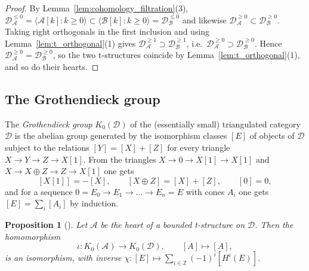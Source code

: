 \documentclass[12pt]{amsart}
\newtheorem{proposition}[theorem]{Proposition}
\numberwithin{theorem}{section}
\theoremstyle{definition}
\newcommand{\ZZ}{\mathbb{Z}}
\newcommand{\calA}{\mathcal{A}}
\newcommand{\calB}{\mathcal{B}}
\newcommand{\Kgroup}{K_0}
\newcommand{\calD}{\mathcal{D}}
\newcommand{\Dle}[1]{\calD^{\leqslant #1}}
\newcommand{\Dge}[1]{\calD^{\geqslant #1}}
\begin{document}
	\begin{proof}
		By Lemma~\ref{lem:cohomology_filtration}(3), $\Dle{0}_{\calA} = \langle \calA[k] : k \geqslant 0 \rangle \subset \langle \calB[k] : k \geqslant 0 \rangle = \Dle{0}_{\calB}$ and likewise $\Dge{0}_{\calA} \subset \Dge{0}_{\calB}$.
		Taking right orthogonals in the first inclusion and using Lemma~\ref{lem:t_orthogonal}(1) gives $\Dge{1}_{\calA} \supset \Dge{1}_{\calB}$, i.e.\ $\Dge{0}_{\calA} \supset \Dge{0}_{\calB}$.
		Hence $\Dge{0}_{\calA} = \Dge{0}_{\calB}$, so the two t-structures coincide by Lemma~\ref{lem:t_orthogonal}(1), and so do their hearts.
	\end{proof}
	
	\subsection{The Grothendieck group}
	
	The \emph{Grothendieck group} $\Kgroup(\calD)$ of the (essentially small) triangulated category $\calD$ is the abelian group generated by the isomorphism classes $[E]$ of objects of $\calD$ subject to the relations $[Y] = [X] + [Z]$ for every triangle $X \to Y \to Z \to X[1]$.
	From the triangles $X \to 0 \to X[1] \to X[1]$ and $X \to X \oplus Z \to Z \to X[1]$ one gets
	\[
	[X[1]] = -[X], \qquad [X \oplus Z] = [X] + [Z], \qquad [0] = 0 ,
	\]
	and for a sequence $0 = E_0 \to E_1 \to \ldots \to E_n = E$ with cones $A_i$ one gets $[E] = \sum_i [A_i]$ by induction.
	
	\begin{proposition}[{\cite[Exercise~5.4]{MS17}}]
		\label{prop:K0_heart}
		Let $\calA$ be the heart of a bounded t-structure on $\calD$.
		Then the homomorphism
		\[
		\iota \colon \Kgroup(\calA) \longrightarrow \Kgroup(\calD), \qquad [A] \longmapsto [A],
		\]
		is an isomorphism, with inverse $\chi \colon [E] \mapsto \sum_{i \in \ZZ} (-1)^i [H^i(E)]$.
	\end{proposition}
	
\end{document}
